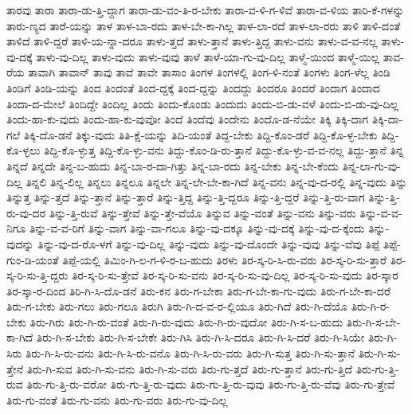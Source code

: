 {ತಾರವು
ತಾರಾ
ತಾರಾ-ಡು-ತ್ತಿ-ದ್ದಾಗ
ತಾರಾ-ಡು-ವಂ-ತಿ-ರ-ಬೇಕು
ತಾರಾ-ವ-ಳಿ-ಗ-ಳಿವೆ
ತಾರಾ-ವ-ಳಿಯ
ತಾರಿ-ಕೆ-ಗಳನ್ನು
ತಾರು-ಣ್ಯದ
ತಾರೆ-ಯನ್ನು
ತಾಳ
ತಾಳ-ಬಾ-ರದು
ತಾಳ-ಬೇ-ಕಾ-ಗಿಲ್ಲ
ತಾಳ-ಲಾ-ರದೆ
ತಾಳ-ಲಾ-ರರು
ತಾಳಿ
ತಾಳಿ-ದಂತೆ
ತಾಳಿದೆ
ತಾಳಿ-ದ್ದರೆ
ತಾಳಿ-ಯ-ನ್ನಾ-ದರೂ
ತಾಳು-ತ್ತದೆ
ತಾಳು-ತ್ತಾನೆ
ತಾಳು-ತ್ತಿದ್ದ
ತಾಳು-ವನು
ತಾಳು-ವ-ವ-ನಲ್ಲ
ತಾಳು-ವು-ದಕ್ಕೆ
ತಾಳು-ವು-ದಿಲ್ಲ
ತಾಳು-ವುದು
ತಾಳು-ವುವು
ತಾಳೆ
ತಾಳೆ-ಯಾ-ಗು-ವು-ದಿಲ್ಲ
ತಾಳ್ಮೆ-ಯಿಂದ
ತಾಳ್ಮೆ-ಯಿಲ್ಲ
ತಾವ-ರೆಯ
ತಾವಾಗಿ
ತಾವಾನ್
ತಾವು
ತಾವೆ
ತಾವೇ
ತಾಸಾಂ
ತಿಂಗಳ
ತಿಂಗಳಲ್ಲಿ
ತಿಂಗ-ಳಿ-ನಂತೆ
ತಿಂಗಳು
ತಿಂಗ-ಳೆಲ್ಲ
ತಿಂಡಿ
ತಿಂಡಿಗೆ
ತಿಂಡಿ-ಯನ್ನು
ತಿಂದ
ತಿಂದಂತೆ
ತಿಂದ-ದ್ದಕ್ಕೆ
ತಿಂದ-ದ್ದನ್ನು
ತಿಂದದ್ದು
ತಿಂದರೂ
ತಿಂದರೆ
ತಿಂದಾಗ
ತಿಂದಾದ
ತಿಂದಾ-ದ-ಮೇಲೆ
ತಿಂದಿದ್ದೇ
ತಿಂದಿಲ್ಲ
ತಿಂದು
ತಿಂದು-ಕೊಂಡು
ತಿಂದುದು
ತಿಂದು-ಬಿ-ಡು-ವಳೆ
ತಿಂದು-ಬಿ-ಡು-ವು-ದಿಲ್ಲ
ತಿಂದು-ಹಾ-ಕು-ವುದು
ತಿಂದು-ಹಾ-ಕು-ವುವೋ
ತಿಂದೆ
ತಿಂದೆವು
ತಿಂದೇನು
ತಿಂದೊ-ಡ-ನೆಯೇ
ತಿಕ್ಕಿ
ತಿಕ್ಕಿ-ದಾಗ
ತಿಕ್ಕಿ-ದಾ-ಗಲೆ
ತಿಕ್ಕಿ-ದೊ-ಡನೆ
ತಿಕ್ಕು-ವುದು
ತಿತಿ-ಕ್ಷೆ-ಯನ್ನು
ತಿದಿ-ಯಂತೆ
ತಿದ್ದ-ಬೇಕು
ತಿದ್ದಿ-ಕೊಂ-ಡರೆ
ತಿದ್ದಿ-ಕೊ-ಳ್ಳ-ಬೇಕು
ತಿದ್ದಿ-ಕೊ-ಳ್ಳಲು
ತಿದ್ದಿ-ಕೊ-ಳ್ಳುತ್ತ
ತಿದ್ದಿ-ಕೊ-ಳ್ಳು-ವನು
ತಿದ್ದು-ಕೊಂ-ಡಿ-ರು-ತ್ತಾನೆ
ತಿದ್ದು-ಕೊ-ಳ್ಳು-ವ-ವ-ನಲ್ಲ
ತಿದ್ದು-ತ್ತಾನೆ
ತಿನ್ನ
ತಿನ್ನದೆ
ತಿನ್ನದೇ
ತಿನ್ನ-ಬ-ಹುದು
ತಿನ್ನ-ಬಾ-ರ-ದಾ-ಗಿತ್ತು
ತಿನ್ನ-ಬಾ-ರದು
ತಿನ್ನ-ಬೇಕು
ತಿನ್ನ-ಬೇ-ಕೆಂದು
ತಿನ್ನ-ಲಾ-ಗು-ವು-ದಿಲ್ಲ
ತಿನ್ನಲಿ
ತಿನ್ನ-ಲಿಲ್ಲ
ತಿನ್ನಲು
ತಿನ್ನಲೂ
ತಿನ್ನಲೇ
ತಿನ್ನ-ಲೇ-ಬೇ-ಕಾ-ಗಿದೆ
ತಿನ್ನ-ವನು
ತಿನ್ನ-ವು-ದ-ರಲ್ಲಿ
ತಿನ್ನ-ವುದು
ತಿನ್ನು
ತಿನ್ನುತ್ತ
ತಿನ್ನು-ತ್ತದೆ
ತಿನ್ನು-ತ್ತಾನೆ
ತಿನ್ನು-ತ್ತಾರೆ
ತಿನ್ನು-ತ್ತಿದ್ದ
ತಿನ್ನು-ತ್ತಿ-ದ್ದರೂ
ತಿನ್ನು-ತ್ತಿ-ದ್ದರೆ
ತಿನ್ನು-ತ್ತಿ-ರು-ವಾಗ
ತಿನ್ನು-ತ್ತಿ-ರು-ವು-ದರ
ತಿನ್ನು-ತ್ತಿ-ರುವೆ
ತಿನ್ನು-ತ್ತೇವೆ
ತಿನ್ನು-ತ್ತೇ-ವೆಯೊ
ತಿನ್ನುವ
ತಿನ್ನು-ವಂತೆ
ತಿನ್ನು-ವನು
ತಿನ್ನು-ವರು
ತಿನ್ನು-ವ-ವ-ನಿಗೂ
ತಿನ್ನು-ವ-ವ-ರಿಗೆ
ತಿನ್ನು-ವಾಗ
ತಿನ್ನು-ವಾ-ಗಲೂ
ತಿನ್ನು-ವು-ದಕ್ಕೂ
ತಿನ್ನು-ವು-ದಕ್ಕೆ
ತಿನ್ನು-ವು-ದ-ಕ್ಕೆಂದು
ತಿನ್ನು-ವುದನ್ನು
ತಿನ್ನು-ವು-ದ-ರೊ-ಳಗೆ
ತಿನ್ನು-ವು-ದಿಲ್ಲ
ತಿನ್ನು-ವುದು
ತಿನ್ನು-ವು-ದೊಂದೇ
ತಿನ್ನು-ವುವು
ತಿನ್ನು-ವೆವು
ತಿಪ್ಪೆ
ತಿಪ್ಪೆ-ಗುಂ-ಡಿ-ಯಂತೆ
ತಿಪ್ಪೆ-ಯಲ್ಲಿ
ತಿಮಿಂ-ಗಿ-ಲ-ಗ-ಳಿ-ರ-ಬ-ಹುದು
ತಿರಳು
ತಿರ-ಸ್ಕ-ರಿ-ಸಿ-ರು-ವರು
ತಿರ-ಸ್ಕ-ರಿ-ಸು-ತ್ತಾರೆ
ತಿರ-ಸ್ಕ-ರಿ-ಸು-ತ್ತಿ-ದ್ದರು
ತಿರ-ಸ್ಕ-ರಿ-ಸು-ತ್ತೇವೆ
ತಿರ-ಸ್ಕ-ರಿ-ಸು-ವನು
ತಿರ-ಸ್ಕ-ರಿ-ಸು-ವು-ದಿಲ್ಲ
ತಿರ-ಸ್ಕ-ರಿ-ಸು-ವುದು
ತಿರ-ಸ್ಕಾರ
ತಿರ-ಸ್ಕಾ-ರ-ದಿಂದ
ತಿರಿ-ಗಿ-ಸಿ-ದೊ-ಡನೆ
ತಿರು-ಕನ
ತಿರು-ಗ-ಬೇಕಾ
ತಿರು-ಗ-ಬೇ-ಕಾ-ಗು-ವುದು
ತಿರು-ಗ-ಬೇ-ಕಾ-ದರೆ
ತಿರು-ಗ-ಬೇಕು
ತಿರು-ಗಲು
ತಿರು-ಗಲೂ
ತಿರುಗಿ
ತಿರು-ಗಿ-ದ-ವ-ರ-ಲ್ಲಿಯೂ
ತಿರು-ಗಿದೆ
ತಿರು-ಗಿ-ದೆಯೊ
ತಿರು-ಗಿ-ರ-ಬೇಕು
ತಿರು-ಗಿರು
ತಿರು-ಗಿ-ರು-ವಂತೆ
ತಿರು-ಗಿ-ರು-ವುದು
ತಿರು-ಗಿ-ರು-ವುದೋ
ತಿರು-ಗಿ-ಸ-ಬ-ಹುದು
ತಿರು-ಗಿ-ಸ-ಬೇ-ಕಾ-ಗಿದೆ
ತಿರು-ಗಿ-ಸ-ಬೇಕು
ತಿರು-ಗಿ-ಸ-ಬೇಕೇ
ತಿರು-ಗಿಸಿ
ತಿರು-ಗಿ-ಸಿ-ದರೂ
ತಿರು-ಗಿ-ಸಿ-ದರೆ
ತಿರು-ಗಿ-ಸಿಯೇ
ತಿರು-ಗಿ-ಸಿರು
ತಿರು-ಗಿ-ಸಿ-ರು-ವನು
ತಿರು-ಗಿ-ಸಿ-ರು-ವನೊ
ತಿರು-ಗಿ-ಸಿ-ರು-ವರು
ತಿರು-ಗಿ-ಸುತ್ತ
ತಿರು-ಗಿ-ಸು-ತ್ತಾನೆ
ತಿರು-ಗಿ-ಸು-ತ್ತೇನೆ
ತಿರು-ಗಿ-ಸುವ
ತಿರು-ಗಿ-ಸು-ವನು
ತಿರು-ಗಿ-ಸು-ವರು
ತಿರು-ಗು-ತ್ತದೆ
ತಿರು-ಗು-ತ್ತಾನೆ
ತಿರು-ಗು-ತ್ತಿದೆ
ತಿರು-ಗು-ತ್ತಿ-ರುವ
ತಿರು-ಗು-ತ್ತಿ-ರು-ವರೋ
ತಿರು-ಗು-ತ್ತಿ-ರು-ವುದು
ತಿರು-ಗು-ತ್ತಿ-ರು-ವುವು
ತಿರು-ಗು-ತ್ತಿ-ರು-ವೆವು
ತಿರು-ಗು-ತ್ತೇವೆ
ತಿರು-ಗು-ವಂತೆ
ತಿರು-ಗು-ವನು
ತಿರು-ಗು-ವರು
ತಿರು-ಗು-ವು-ದಿಲ್ಲ
}
